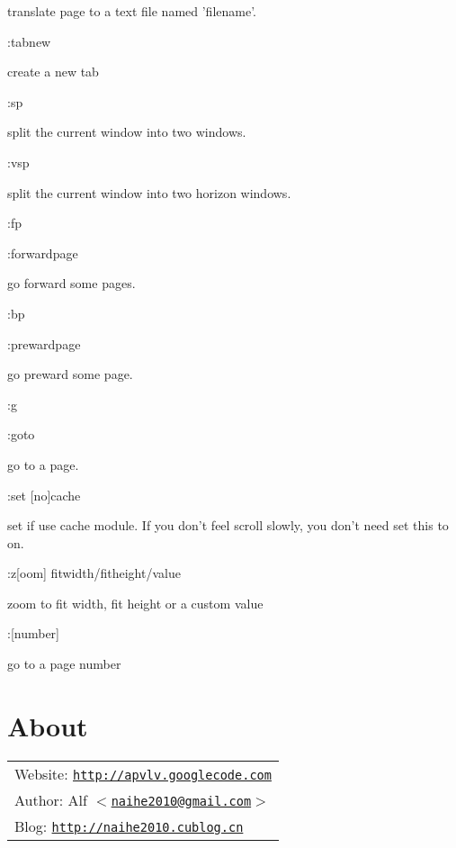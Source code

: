 \documentclass[a4paper,12pt]{article}
\begin{document}
\begin{description}
translate page to a text file named 'filename'.

\item :tabnew

create a new tab

\item :sp

split the current window into two windows.

\item :vsp

split the current window into two horizon windows.

\item :fp

\item :forwardpage 

go forward some pages.

\item :bp

\item :prewardpage

go preward some page.

\item :g

\item :goto

go to a page.

\item :set [no]cache

set if use cache module. If you don't feel scroll slowly, you don't need set this to on.

\item :z[oom] fitwidth/fitheight/value

zoom to fit width, fit height or a custom value

\item :[number]

go to a page number

\end{description}

\newpage

\section{About}\label{about}

\large
\begin{tabular}{l}
  Website: \texttt{\href{http://apvlv.googlecode.com}{http://apvlv.googlecode.com}} \\
  Author: Alf \texttt{\href{mailto:naihe2010@gmail.com}{$<$naihe2010@gmail.com$>$}} \\
Blog: \texttt{\href{http://naihe2010.cublog.cn}{http://naihe2010.cublog.cn}}
\end{tabular}
\end{document}
